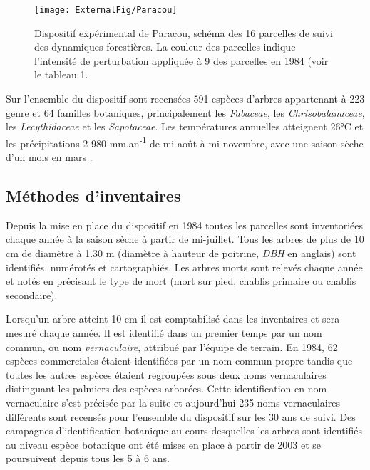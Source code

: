 \documentclass[
  11pt,
  french,
  A4paper,
  extrafontsizes,onecolumn,openright
  ]{memoir}
\begin{document}
\begin{figure}

{\centering \texttt{[image: ExternalFig/Paracou]} 

}

\caption{Dispositif expérimental de Paracou, schéma des 16 parcelles de suivi des dynamiques forestières. La couleur des parcelles indique l'intensité de perturbation appliquée à 9 des parcelles en 1984 (voir le tableau 1.}\label{fig:ParacouDesign}
\end{figure}

Sur l'ensemble du dispositif sont recensées 591 espèces d'arbres
appartenant à 223 genre et 64 familles botaniques, principalement les
\emph{Fabaceae}, les \emph{Chrisobalanaceae}, les \emph{Lecythidaceae}
et les \emph{Sapotaceae}. Les températures annuelles atteignent 26°C et
les précipitations 2 980 mm.an\textsuperscript{-1} de mi-août à
mi-novembre, avec une saison sèche d'un mois en mars
\autocite{Wagner2011}.

\subsection{Méthodes d'inventaires}\label{methodes-dinventaires}

Depuis la mise en place du dispositif en 1984 toutes les parcelles sont
inventoriées chaque année à la saison sèche à partir de mi-juillet. Tous
les arbres de plus de 10 cm de diamètre à 1.30 m (diamètre à hauteur de
poitrine, \emph{DBH} en anglais) sont identifiés, numérotés et
cartographiés. Les arbres morts sont relevés chaque année et notés en
précisant le type de mort (mort sur pied, chablis primaire ou chablis
secondaire).

Lorsqu'un arbre atteint 10 cm il est comptabilisé dans les inventaires
et sera mesuré chaque année. Il est identifié dans un premier temps par
un nom commun, ou nom \emph{vernaculaire}, attribué par l'équipe de
terrain. En 1984, 62 espèces commerciales étaient identifiées par un nom
commun propre tandis que toutes les autres espèces étaient regroupées
sous deux noms vernaculaires distinguant les palmiers des espèces
arborées. Cette identification en nom vernaculaire s'est précisée par la
suite et aujourd'hui 235 noms vernaculaires différents sont recensés
pour l'ensemble du dispositif sur les 30 ans de suivi. Des campagnes
d'identification botanique au cours desquelles les arbres sont
identifiés au niveau espèce botanique ont été mises en place à partir de
2003 et se poursuivent depuis tous les 5 à 6 ans.
\end{document}

